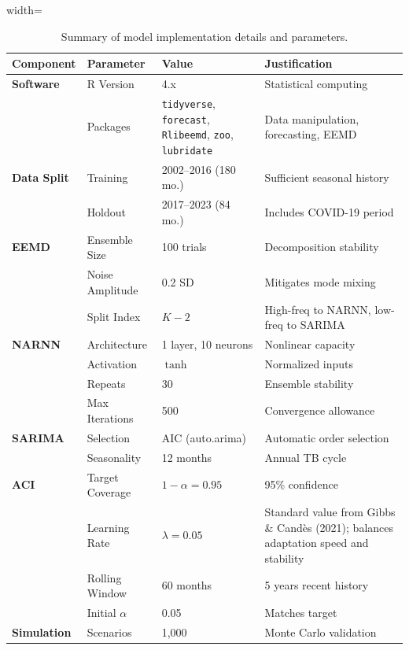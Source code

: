 \documentclass[final,3p,times,twocolumn,authoryear]{elsarticle}
\begin{document}
\begin{table}[htbp]
\centering
\footnotesize
\caption{Summary of model implementation details and parameters.}
\label{tab:implementation}
\begin{adjustbox}{width=\textwidth}
\begin{tabular}{llp{3cm}p{6cm}}
\toprule
\textbf{Component} & \textbf{Parameter} & \textbf{Value} & \textbf{Justification} \\
\midrule
\textbf{Software} & R Version & 4.x & Statistical computing \\
                  & Packages & \texttt{tidyverse}, \texttt{forecast}, \texttt{Rlibeemd}, \texttt{zoo}, \texttt{lubridate} & Data manipulation, forecasting, EEMD \\
\midrule
\textbf{Data Split} & Training & 2002--2016 (180 mo.) & Sufficient seasonal history \\
                    & Holdout & 2017--2023 (84 mo.) & Includes COVID-19 period \\
\midrule
\textbf{EEMD} & Ensemble Size & 100 trials & Decomposition stability \\
              & Noise Amplitude & 0.2 SD & Mitigates mode mixing \\
              & Split Index & $K-2$ & High-freq to NARNN, low-freq to SARIMA \\
\midrule
\textbf{NARNN} & Architecture & 1 layer, 10 neurons & Nonlinear capacity \\
               & Activation & $\tanh$ & Normalized inputs \\
               & Repeats & 30 & Ensemble stability \\
               & Max Iterations & 500 & Convergence allowance \\
\midrule
\textbf{SARIMA} & Selection & AIC (auto.arima) & Automatic order selection \\
                & Seasonality & 12 months & Annual TB cycle \\
\midrule
\textbf{ACI} & Target Coverage & $1-\alpha = 0.95$ & 95\% confidence \\
             & Learning Rate & $\lambda = 0.05$ & Standard value from Gibbs \& Cand\`{e}s (2021); balances adaptation speed and stability \\
             & Rolling Window & 60 months & 5 years recent history \\
             & Initial $\alpha$ & 0.05 & Matches target \\
\midrule
\textbf{Simulation} & Scenarios & 1,000 & Monte Carlo validation \\

\end{tabular}
\end{adjustbox}
\end{table}
\end{document}
